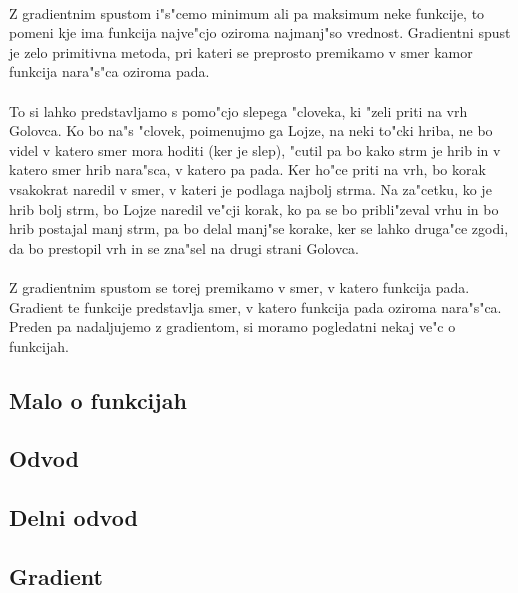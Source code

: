 \paragraph{}
Z gradientnim spustom i"s"cemo minimum ali pa maksimum neke funkcije, to pomeni kje ima funkcija najve"cjo oziroma najmanj"so vrednost. Gradientni spust je zelo primitivna metoda, pri kateri se preprosto premikamo v smer kamor funkcija nara"s"ca oziroma pada.

\paragraph{}
To si lahko predstavljamo s pomo"cjo slepega "cloveka, ki "zeli priti na vrh Golovca. Ko bo na"s "clovek, poimenujmo ga Lojze, na neki to"cki hriba, ne bo videl v katero smer mora hoditi (ker je slep), "cutil pa bo kako strm je hrib in v katero smer hrib nara"sca, v katero pa pada. Ker ho"ce priti na vrh, bo korak vsakokrat naredil v smer, v kateri je podlaga najbolj strma. Na za"cetku, ko je hrib bolj strm, bo Lojze naredil ve"cji korak, ko pa se bo pribli"zeval vrhu in bo hrib postajal manj strm, pa bo delal manj"se korake, ker se lahko druga"ce zgodi, da bo prestopil vrh in se zna"sel na drugi strani Golovca.

\paragraph{}
Z gradientnim spustom se torej premikamo v smer, v katero funkcija pada. Gradient te funkcije predstavlja smer, v katero funkcija pada oziroma nara"s"ca. Preden pa nadaljujemo z gradientom, si moramo pogledatni nekaj ve"c o funkcijah.

\subsection*{Malo o funkcijah}


\subsection*{Odvod}


\subsection*{Delni odvod}


\subsection*{Gradient}


